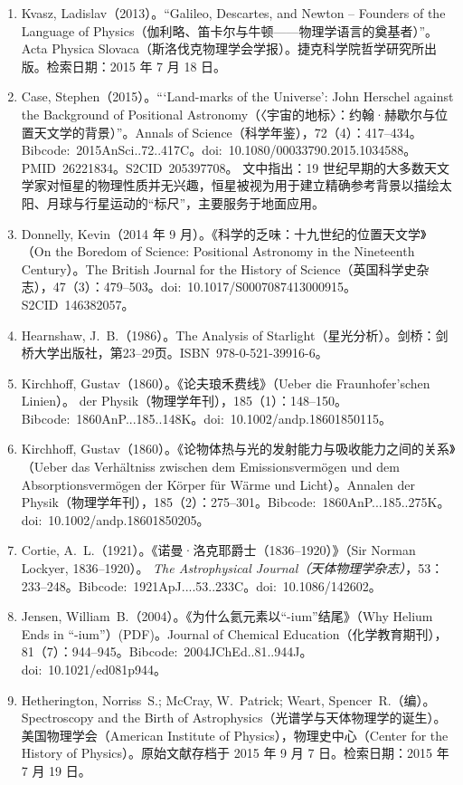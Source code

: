 \begin{enumerate}
  \item Kvasz, Ladislav（2013）。“Galileo, Descartes, and Newton – Founders of the Language of Physics（伽利略、笛卡尔与牛顿——物理学语言的奠基者）”。Acta Physica Slovaca（斯洛伐克物理学会学报）。捷克科学院哲学研究所出版。检索日期：2015 年 7 月 18 日。
  \item Case, Stephen（2015）。“‘Land-marks of the Universe’: John Herschel against the Background of Positional Astronomy（〈宇宙的地标〉：约翰·赫歇尔与位置天文学的背景）”。Annals of Science（科学年鉴），72（4）：417–434。Bibcode:~2015AnSci..72..417C。doi:~10.1080/00033790.2015.1034588。PMID~26221834。S2CID~205397708。  
  文中指出：19 世纪早期的大多数天文学家对恒星的物理性质并无兴趣，恒星被视为用于建立精确参考背景以描绘太阳、月球与行星运动的“标尺”，主要服务于地面应用。
  \item Donnelly, Kevin（2014 年 9 月）。《科学的乏味：十九世纪的位置天文学》（On the Boredom of Science: Positional Astronomy in the Nineteenth Century）。The British Journal for the History of Science（英国科学史杂志），47（3）：479–503。doi:~10.1017/S0007087413000915。S2CID~146382057。
  \item Hearnshaw, J.~B.（1986）。The Analysis of Starlight（星光分析）。剑桥：剑桥大学出版社，第23–29页。ISBN~978-0-521-39916-6。
  \item Kirchhoff, Gustav（1860）。《论夫琅禾费线》（Ueber die Fraunhofer'schen Linien）。  
  \textitAnnalen der Physik（物理学年刊），185（1）：148–150。Bibcode:~1860AnP...185..148K。doi:~10.1002/andp.18601850115。
  \item Kirchhoff, Gustav（1860）。《论物体热与光的发射能力与吸收能力之间的关系》（Ueber das Verhältniss zwischen dem Emissionsvermögen und dem Absorptionsvermögen der Körper für Wärme und Licht）。Annalen der Physik（物理学年刊），185（2）：275–301。Bibcode:~1860AnP...185..275K。doi:~10.1002/andp.18601850205。
  \item Cortie, A.~L.（1921）。《诺曼·洛克耶爵士（1836–1920）》（Sir Norman Lockyer, 1836–1920）。  
  \textit{The Astrophysical Journal（天体物理学杂志）}，53：233–248。Bibcode:~1921ApJ....53..233C。doi:~10.1086/142602。
  \item Jensen, William~B.（2004）。《为什么氦元素以“-ium”结尾》（Why Helium Ends in ``-ium''）(PDF)。Journal of Chemical Education（化学教育期刊），81（7）：944–945。Bibcode:~2004JChEd..81..944J。doi:~10.1021/ed081p944。
  \item Hetherington, Norriss~S.; McCray, W.~Patrick; Weart, Spencer~R.（编）。Spectroscopy and the Birth of Astrophysics（光谱学与天体物理学的诞生）。美国物理学会（American Institute of Physics），物理史中心（Center for the History of Physics）。原始文献存档于 2015 年 9 月 7 日。检索日期：2015 年 7 月 19 日。

\end{enumerate}
